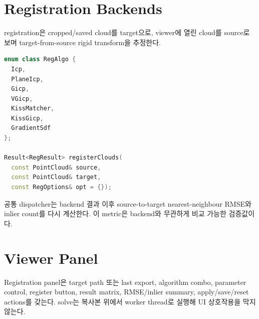 \section{Registration Backends}

registration은 cropped/saved cloud를 target으로, viewer에 열린 cloud를 source로
보며 target-from-source rigid transform을 추정한다.

\begin{lstlisting}[language=C++]
enum class RegAlgo {
  Icp,
  PlaneIcp,
  Gicp,
  VGicp,
  KissMatcher,
  KissGicp,
  GradientSdf
};

Result<RegResult> registerClouds(
  const PointCloud& source,
  const PointCloud& target,
  const RegOptions& opt = {});
\end{lstlisting}

공통 dispatcher는 backend 결과 이후 source-to-target nearest-neighbour RMSE와
inlier count를 다시 계산한다. 이 metric은 backend와 무관하게 비교 가능한
검증값이다.

\section{Viewer Panel}

Registration panel은 target path 또는 last export, algorithm combo, parameter
control, register button, result matrix, RMSE/inlier summary, apply/save/reset
actions를 갖는다. solve는 복사본 위에서 worker thread로 실행해 UI 상호작용을
막지 않는다.

